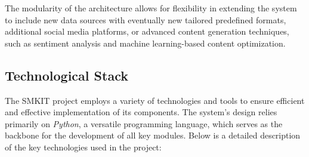 The modularity of the architecture allows for flexibility in extending the system to include new data sources with eventually new tailored predefined formats, additional social media platforms, or advanced content generation techniques, such as sentiment analysis and machine learning-based content optimization.

\subsection{Technological Stack}
\label{subsec:technological_stack}
The SMKIT project employs a variety of technologies and tools to ensure efficient and effective implementation of its components. The system's design relies primarily on \textit{Python}, a versatile programming language, which serves as the backbone for the development of all key modules. Below is a detailed description of the key technologies used in the project:

